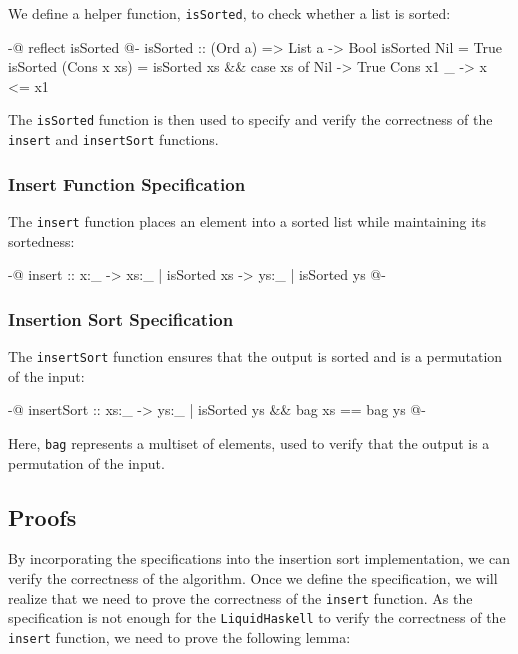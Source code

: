 \documentclass[]{rptuseminar}
\begin{document}
We define a helper function, \texttt{isSorted}, to check whether a list is sorted:

\begin{haskell}
{-@ reflect isSorted @-}
isSorted :: (Ord a) => List a -> Bool
isSorted Nil = True
isSorted (Cons x xs) =
  isSorted xs && case xs of
    Nil        -> True
    Cons x1 _  -> x <= x1
\end{haskell}

The \texttt{isSorted} function is then used to specify and verify the correctness of the \texttt{insert} and \texttt{insertSort} functions.

\subsubsection{Insert Function Specification}

The \texttt{insert} function places an element into a sorted list while maintaining its sortedness:

\begin{haskell}
{-@ insert :: x:_ -> {xs:_ | isSorted xs} -> {ys:_ | isSorted ys} @-}
\end{haskell}

\subsubsection{Insertion Sort Specification}

The \texttt{insertSort} function ensures that the output is sorted and is a permutation of the input:

\begin{haskell}
{-@ insertSort :: xs:_ -> {ys:_ | isSorted ys && bag xs == bag ys} @-}
\end{haskell}

Here, \texttt{bag} represents a multiset of elements, used to verify that the output is a permutation of the input.

\subsection{Proofs}
By incorporating the specifications into the insertion sort implementation, we can verify the correctness of the algorithm.
Once we define the specification, we will realize that we need to prove the correctness of the \texttt{insert} function.
As the specification is not enough for the \texttt{LiquidHaskell} to verify the correctness of the \texttt{insert} function, we need to prove the following lemma:
\end{document}
